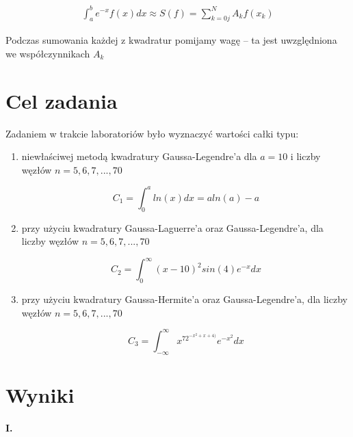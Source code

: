 \documentclass{article}
\begin{document}
 \begin{equation}
\begin{array}{c}
\displaystyle \int_{a}^{b} e^{-x}f(x)dx \approx S(f) = \displaystyle \sum_{k=0 j}^N A_kf(x_k)
\end{array}
\end{equation}

Podczas sumowania każdej z kwadratur pomijamy wagę – ta jest uwzględniona we
współczynnikach $A_k$

\section{Cel zadania}

Zadaniem w trakcie laboratoriów było wyznaczyć wartości całki typu: 

\begin{enumerate}
    \item niewłaściwej metodą  kwadratury Gaussa-Legendre’a dla $a=10$ i liczby węzłów $n = 5, 6, 7, . . . , 70$ 
    
    \begin{equation}
        C_1=\displaystyle \int_{0}^{a}ln(x)dx=aln(a)-a
    \end{equation}
    
    \item przy użyciu kwadratury Gaussa-Laguerre’a oraz Gaussa-Legendre’a,
dla liczby węzłów $n = 5, 6, 7, . . . , 70$

    \begin{equation}
        C_2=\displaystyle \int_{0}^{\infty}(x-10)^2sin(4)e^{-x}dx
    \end{equation}
    
    \item przy użyciu kwadratury Gaussa-Hermite’a oraz Gaussa-Legendre’a, dla liczby węzłów $n = 5, 6, 7, . . . , 70$

    \begin{equation}
        C_3=\displaystyle \int_{-\infty}^{\infty}x^72^{-x^2+x+4)}e^{-x^2}dx
    \end{equation}

\end{enumerate}

\section{Wyniki}
\textbf{I.}
\end{document}
